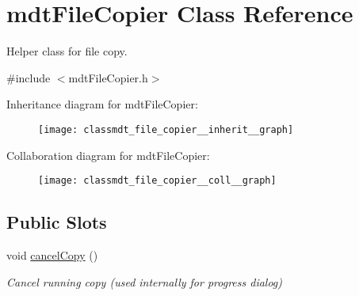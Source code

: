 \hypertarget{classmdt_file_copier}{\section{mdt\-File\-Copier Class Reference}
\label{classmdt_file_copier}
}


Helper class for file copy.  




{\ttfamily \#include $<$mdt\-File\-Copier.\-h$>$}



Inheritance diagram for mdt\-File\-Copier\-:\nopagebreak
\begin{figure}[H]
\begin{center}
\leavevmode
\texttt{[image: classmdt\_file\_copier\_\_inherit\_\_graph]}
\end{center}
\end{figure}


Collaboration diagram for mdt\-File\-Copier\-:\nopagebreak
\begin{figure}[H]
\begin{center}
\leavevmode
\texttt{[image: classmdt\_file\_copier\_\_coll\_\_graph]}
\end{center}
\end{figure}
\subsection*{Public Slots}
\begin{DoxyCompactItemize}
\item 
void \hyperlink{classmdt_file_copier_ab9a0a4121a3fa0c70652413ad7917714}{cancel\-Copy} ()
\begin{DoxyCompactList}\small\item\em Cancel running copy (used internally for progress dialog) \end{DoxyCompactList}\end{DoxyCompactItemize}
